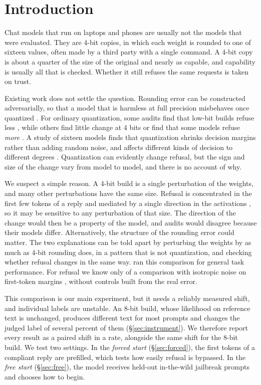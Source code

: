 \section{Introduction}

Chat models that run on laptops and phones are usually not the models that were evaluated. They are 4-bit copies, in which each weight is rounded to one of sixteen values, often made by a third party with a single command. A 4-bit copy is about a quarter of the size of the original and nearly as capable, and capability is usually all that is checked. Whether it still refuses the same requests is taken on trust.

Existing work does not settle the question. Rounding error can be constructed adversarially, so that a model that is harmless at full precision misbehaves once quantized \citep{egashira2024exploiting, egashira2025gguf}. For ordinary quantization, some audits find that low-bit builds refuse less \citep{kadadekar2026quality}, while others find little change at 4 bits or find that some models refuse \emph{more} \citep{prasad2026temperature}. A study of sixteen models finds that quantization shrinks decision margins rather than adding random noise, and affects different kinds of decision to different degrees \citep{wu2026decisions}. Quantization can evidently change refusal, but the sign and size of the change vary from model to model, and there is no account of why.

We suspect a simple reason. A 4-bit build is a single perturbation of the weights, and many other perturbations have the same size. Refusal is concentrated in the first few tokens of a reply \citep{qi2024shallow} and mediated by a single direction in the activations \citep{arditi2024refusal}, so it may be sensitive to any perturbation of that size. The direction of the change would then be a property of the model, and audits would disagree because their models differ. Alternatively, the structure of the rounding error could matter. The two explanations can be told apart by perturbing the weights by as much as 4-bit rounding does, in a pattern that is not quantization, and checking whether refusal changes in the same way. \citet{gong2024perturbation} ran this comparison for general task performance. For refusal we know only of a comparison with isotropic noise on first-token margins \citep{razan2026firstorder}, without controls built from the real error.

This comparison is our main experiment, but it needs a reliably measured shift, and individual labels are unstable. An 8-bit build, whose likelihood on reference text is unchanged, produces different text for most prompts and changes the judged label of several percent of them (\S\ref{sec:instrument}). We therefore report every result as a paired shift in a rate, alongside the same shift for the 8-bit build. We test two settings. In the \emph{forced start} (\S\ref{sec:forced}), the first tokens of a compliant reply are prefilled, which tests how easily refusal is bypassed. In the \emph{free start} (\S\ref{sec:free}), the model receives held-out in-the-wild jailbreak prompts and chooses how to begin.

